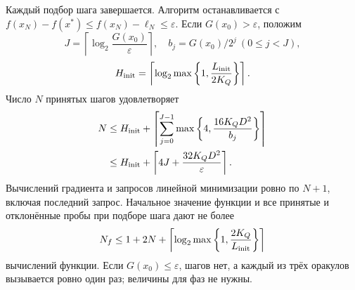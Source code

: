 \begin{theorem}
\label{thm:finite_stopping}
Каждый подбор шага завершается. Алгоритм останавливается с
$f(x_N)-f(x^*)\le f(x_N)-\ell_N\le\varepsilon$.
Если $G(x_0)>\varepsilon$, положим
\[
 J=\left\lceil\log_2\frac{G(x_0)}{\varepsilon}\right\rceil,
 \quad b_j=G(x_0)/2^j\ (0\le j<J),
\]
\[
 H_{\rm init}=\left\lceil
 \log_2\max\left\{1,\frac{L_{\rm init}}{2K_Q}\right\}\right\rceil.
\]
Число $N$ принятых шагов удовлетворяет
\begin{align}
 N&\le H_{\rm init}+\left\lceil\sum_{j=0}^{J-1}
       \max\left\{4,\frac{16K_QD^2}{b_j}\right\}\right\rceil
       \label{eq:stopping_steps}\\
  &\le H_{\rm init}+\left\lceil4J+
       \frac{32K_QD^2}{\varepsilon}\right\rceil.
       \label{eq:stopping_simple}
\end{align}
Вычислений градиента и запросов линейной минимизации ровно по $N+1$,
включая последний запрос. Начальное значение функции и все принятые
и отклонённые пробы при подборе шага дают не более
\begin{equation}\label{eq:stopping_values}
 N_f\le 1+2N+
 \left\lceil\log_2\max\left\{1,\frac{2K_Q}{L_{\rm init}}\right\}\right\rceil
\end{equation}
вычислений функции.
Если $G(x_0)\le\varepsilon$, шагов нет, а каждый из трёх оракулов
вызывается ровно один раз; величины для фаз не нужны.
\end{theorem}

